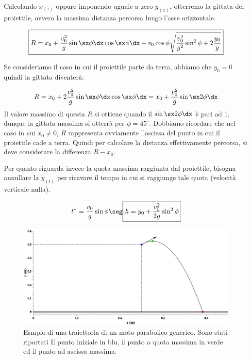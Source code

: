  Calcolando $x_{(\tau)}$ oppure imponendo uguale a zero $y_{(x)}$, otterremo la gittata del proiettile, ovvero la massima distanza percorsa lungo l'asse orizzontale.

\begin{equation}
\boxed{R = x_0 + \frac{v_0^2}{g}\sin\sx\phi\dx\cos\sx\phi\dx + v_0\cos\phi\sqrt{\frac{v_0^2}{g^2}\sin^2\phi+2\frac{y_0}g}}
\end{equation}

Se consideriamo il caso in cui il proiettile parte da terra, abbiamo che $y_0 = 0$ quindi la gittata diventerà:

\begin{equation}
R = x_0 +2\frac{v_0^2}{g}\sin\sx\phi\dx\cos\sx\phi\dx = x_0 + \frac{v_0^2}{g}\sin\sx2\phi\dx
\end{equation}
Il valore massimo di questa $R$ si ottiene quando il $\sin\sx2\phi\dx$ è pari ad 1, dunque la gittata massima si otterrà per $\phi = 45^\circ$. Dobbiamo ricordare che nel caso in cui $x_0\ne0$, $R$ rappresenta ovviamente l'ascissa del punto in cui il proiettile cade a terra. Quindi per calcolare la distanza effettivamente percorsa, si deve considerare la differenza $R-x_0$.

Per quanto riguarda invece la quota massima raggiunta dal proiettile, bisogna annullare la $\dot y_{(t)}$ per ricavare il tempo in cui si raggiunge tale quota (velocità verticale nulla). 

\begin{equation}
t^* = \frac{v_0}{g}\sin\phi\seg\boxed{h = y_0 + \frac{v_0^2}{2g}\sin^2\phi}
\end{equation}

\begin{figure}[htbp]
\begin{center}
\includegraphics[width=13cm]{images/Motopar1.png} 
\caption{Esmpio di una traiettoria di un moto parabolico generico. Sono stati riportati Il punto iniziale in blu, il punto a quota massima in verde ed il punto ad ascissa massima.}
\label{default}
\end{center}
\end{figure}

